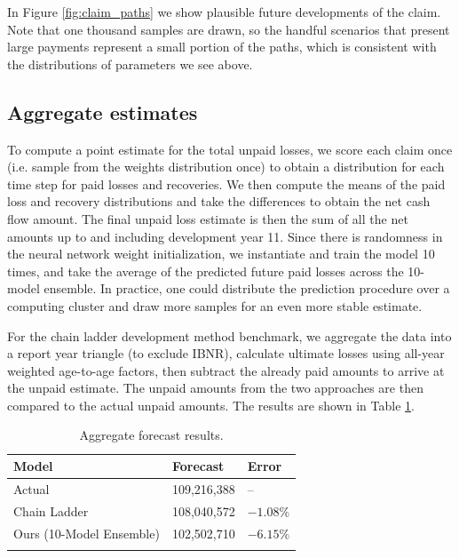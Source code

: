 \documentclass{article}
\begin{document}
In Figure \ref{fig:claim_paths} we show plausible future developments of the claim. Note that one thousand samples are drawn, so the handful scenarios that present large payments represent a small portion of the paths, which is consistent with the distributions of parameters we see above.

\subsection{Aggregate estimates}

To compute a point estimate for the total unpaid losses, we score each claim once (i.e. sample from the weights distribution once) to obtain a distribution for each time step for paid losses and recoveries. We then compute the means of the paid loss and recovery distributions and take the differences to obtain the net cash flow amount. The final unpaid loss estimate is then the sum of all the net amounts up to and including development year 11. Since there is randomness in the neural network weight initialization, we instantiate and train the model 10 times, and take the average of the predicted future paid losses across the 10-model ensemble. In practice, one could distribute the prediction procedure over a computing cluster and draw more samples for an even more stable estimate.

For the chain ladder development method benchmark, we aggregate the data into a report year triangle (to exclude IBNR), calculate ultimate losses using all-year weighted age-to-age factors, then subtract the already paid amounts to arrive at the unpaid estimate. The unpaid amounts from the two approaches are then compared to the actual unpaid amounts. The results are shown in Table \ref{table:results}.

\begin{table}[ht]
\centering
\begin{tabular}[t]{lll}
\toprule
Model & Forecast & Error\\
\midrule
Actual                                & 109,216,388  & --\\
Chain Ladder                          & 108,040,572  & $-1.08\%$\\
Ours (10-Model Ensemble)              & 102,502,710  & $-6.15\%$\\
\bottomrule\\[1ex]
\end{tabular}
\caption{Aggregate forecast results.}
\label{table:results}
\end{table}%
\end{document}
